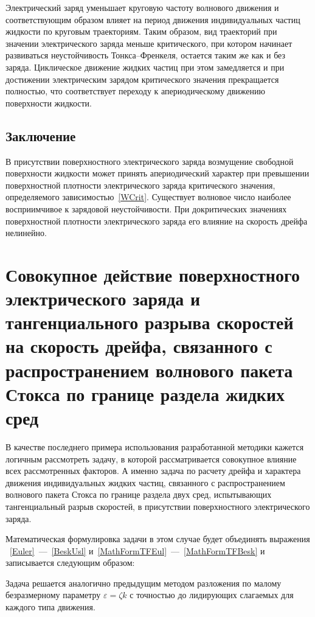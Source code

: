 Электрический заряд уменьшает круговую частоту волнового движения и соответствующим образом влияет на период движения индивидуальных частиц жидкости по круговым траекториям. Таким образом, вид траекторий при значении электрического заряда меньше критического, при котором начинает развиваться неустойчивость Тонкса--Френкеля, остается таким же как и без заряда. Циклическое движение жидких частиц при этом замедляется и при достижении электрическим зарядом критического значения прекращается полностью, что соответствует переходу к апериодическому движению поверхности жидкости.
 
 
 \subsection{Заключение}
 
В присутствии поверхностного электрического заряда возмущение свободной поверхности жидкости может принять апериодический характер при превышении поверхностной плотности электрического заряда критического значения, определяемого зависимостью~\eqref{WCrit}. Существует волновое число наиболее восприимчивое к зарядовой неустойчивости. При докритических значениях поверхностной плотности электрического заряда его влияние на скорость дрейфа нелинейно.

 \section{Совокупное действие поверхностного электрического заряда и тангенциального разрыва скоростей на скорость дрейфа, связанного с распространением волнового пакета Стокса по границе раздела жидких сред}

В качестве последнего примера использования разработанной методики кажется логичным рассмотреть задачу, в которой рассматривается совокупное влияние всех рассмотренных факторов. А именно задача по расчету дрейфа и характера движения индивидуальных жидких частиц, связанного с распространением волнового пакета Стокса по границе раздела двух сред, испытывающих тангенциальный разрыв скоростей, в присутствии поверхностного электрического заряда.

Математическая формулировка задачи в этом случае будет объединять выражения ~\eqref{Euler}~---~\eqref{BeskUsl} и~\eqref{MathFormTFEul}~---~\eqref{MathFormTFBesk} и записывается следующим образом:


Задача решается аналогично предыдущим  методом разложения по малому безразмерному параметру $ \varepsilon=\zeta k $  с точностью до лидирующих слагаемых для каждого типа движения.
	  	
